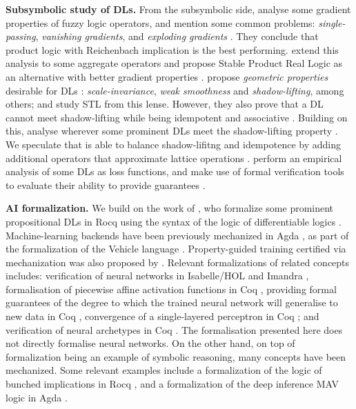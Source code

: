 \textbf{Subsymbolic study of DLs.} From the subsymbolic side, \citeauthor{van2022analyzing} analyse some gradient properties of fuzzy logic operators, and mention some common problems: \emph{single-passing}, \emph{vanishing gradients}, and \emph{exploding gradients} \cite{van2022analyzing}. They conclude that product logic with Reichenbach implication is the best performing. \citeauthor{badreddine2022logic} extend this analysis to some aggregate operators and propose Stable Product Real Logic as an alternative with better gradient properties \citep{badreddine2022logic}. \citeauthor{varnai2020robustness} propose \emph{geometric properties} desirable for DLs \citep{varnai2020robustness}:  \emph{scale-invariance}, \emph{weak smoothness} and \emph{shadow-lifting}, among others;  and study STL \citep{varnai2020robustness} from this lense. However, they also prove that a DL cannot meet shadow-lifting while being idempotent and associative \citep{varnai2020robustness}. Building on this, \citeauthor{affeldt2024taming} analyse wherever some prominent DLs  meet the shadow-lifting property \citep{affeldt2024taming, varnai2020robustness}. We speculate that \citeauthor{capucci2024quantifiers} is able to balance shadow-lifitng and idempotence by adding additional operators that approximate lattice operations \citep{capucci2024quantifiers}. \citeauthor{FLINKOW2025103280} perform an empirical analysis of some DLs as loss functions, and make use of formal verification tools to evaluate their ability to provide guarantees \citep{FLINKOW2025103280}. 

\textbf{AI formalization.} We build on the work of \citeauthor{affeldt2024taming}, who formalize some prominent propositional DLs in Rocq \citep{affeldt2024taming} using the syntax of the logic of differentiable logics \cite{slusarz2023logic}. Machine-learning backends have been previously mechanized in Agda \citep{agdaDL}, as part of the formalization of the Vehicle language \citep{vehicle}.  Property-guided training certified via mechanization was also proposed by \citeauthor{chevallier2022constrainedtrainingneuralnetworks} \citep{chevallier2022constrainedtrainingneuralnetworks}. Relevant formalizations of \SuAI{} related concepts includes: verification of neural networks in Isabelle/HOL \citep{10.1007/978-3-031-27481-7_24} and Imandra \citep{10.1145/3551357.3551372}, formalisation of piecewise affine activation functions in Coq \citep{10.1007/978-3-031-33170-1_4}, providing formal guarantees of the degree to which the trained neural network will generalise to new data in Coq \citep{Bagnall_Stewart_2019}, convergence of a single-layered perceptron in Coq \citep{10.1145/3088525.3088673}; and verification of neural archetypes in Coq \citep{DeMaria2021}. The formalisation presented here does not directly formalise neural networks. On the other hand, on top of formalization being an example of symbolic reasoning, many \SiAI{} concepts have been mechanized. Some relevant examples include a formalization of the logic of bunched implications in Rocq \citep{10.1145/3497775.3503690}, and a formalization of the deep inference MAV logic in Agda \citep{Atkey2024}. 
